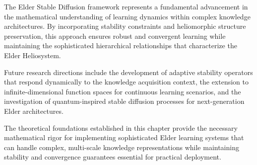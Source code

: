 The Elder Stable Diffusion framework represents a fundamental advancement in the mathematical understanding of learning dynamics within complex knowledge architectures. By incorporating stability constraints and heliomorphic structure preservation, this approach ensures robust and convergent learning while maintaining the sophisticated hierarchical relationships that characterize the Elder Heliosystem.

Future research directions include the development of adaptive stability operators that respond dynamically to the knowledge acquisition context, the extension to infinite-dimensional function spaces for continuous learning scenarios, and the investigation of quantum-inspired stable diffusion processes for next-generation Elder architectures.

The theoretical foundations established in this chapter provide the necessary mathematical rigor for implementing sophisticated Elder learning systems that can handle complex, multi-scale knowledge representations while maintaining stability and convergence guarantees essential for practical deployment.